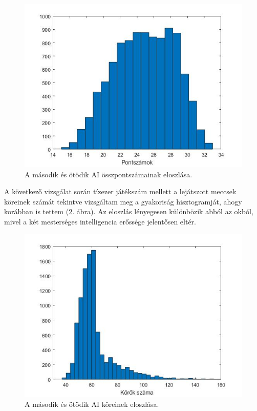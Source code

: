 \begin{figure}[h]
\centering
\includegraphics[scale=0.7]{images/final_scores_AI2vsAI5.jpg}
\caption{A második és ötödik AI összpontszámainak eloszlása.}
\label{fig:scores2v5}
\end{figure}

A következő vizsgálat során tízezer játékszám mellett a lejátszott meccsek köreinek számát tekintve vizsgáltam meg a gyakoriság hisztogramját, ahogy korábban is tettem (\ref{fig:rounds2v5}. ábra). Az eloszlás lényegesen különbözik abból az okból, mivel a két mesterséges intelligencia erőssége jelentősen eltér.

\begin{figure}[h]
\centering
\includegraphics[scale=0.7]{images/round_number_hist_AI2vsAI5.jpg}
\caption{A második és ötödik AI köreinek eloszlása.}
\label{fig:rounds2v5}
\end{figure}

